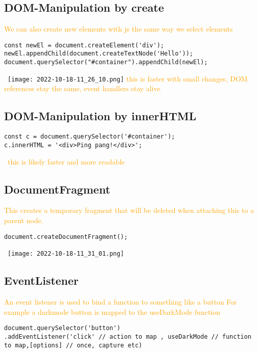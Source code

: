 \documentclass[main.tex,fontsize=6pt,paper=a4,paper=landscape,DIV=calc,]{scrartcl}
\begin{document}
\begin{multicols*}{4}
\subsection{DOM-Manipulation by create}  
\textcolor{orange}{We can also create new elements with js the same way we select elements}
\begin{lstlisting}
const newEl = document.createElement('div');
newEl.appendChild(document.createTextNode('Hello'));
document.querySelector("#container").appendChild(newEl);
\end{lstlisting}
\, \newline
\texttt{[image: 2022-10-18-11\_26\_10.png]}\newline 
\textcolor{orange}{this is faster with small changes, DOM references stay the same, event handlers stay alive}

\subsection{DOM-Manipulation by innerHTML}  
\begin{lstlisting}
const c = document.querySelector('#container');
c.innerHTML = '<div>Ping pang!</div>';
\end{lstlisting}
\, \newline
\textcolor{orange}{this is likely faster and more readable}
 
\subsection{DocumentFragment}  
\textcolor{orange}{This creates a temporary fragment that will be deleted when attaching this to a parent node.}
\begin{lstlisting}
document.createDocumentFragment();
\end{lstlisting}
\, \newline
\texttt{[image: 2022-10-18-11\_31\_01.png]}

\subsection{EventListener}  
\textcolor{orange}{An event listener is used to bind a function to something like a button\newline
For example a darkmode button is mapped to the useDarkMode function}
\begin{lstlisting}
document.querySelector('button')
.addEventListener('click' // action to map , useDarkMode // function to map,[options] // once, capture etc)
\end{lstlisting}
\, \newline



\end{multicols*}
\end{document}
